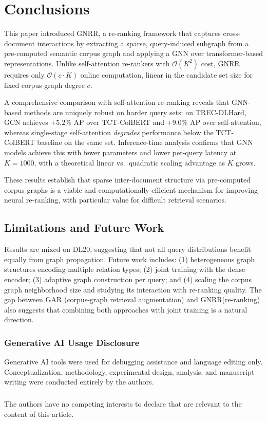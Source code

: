 \documentclass[runningheads]{llncs}
\newcommand{\ModelName}{GNRR\xspace}
\begin{document}
\section{Conclusions}
This paper introduced \ModelName, a re-ranking framework that captures cross-document interactions by extracting a sparse, query-induced subgraph from a pre-computed semantic corpus graph and applying a GNN over transformer-based representations. Unlike self-attention re-rankers with $\mathcal{O}(K^2)$ cost, \ModelName requires only $\mathcal{O}(c \cdot K)$ online computation, linear in the candidate set size for fixed corpus graph degree $c$.

A comprehensive comparison with self-attention re-ranking reveals that GNN-based methods are uniquely robust on harder query sets: on TREC-DLHard, GCN achieves $+5.2\%$ AP over TCT-ColBERT and $+9.0\%$ AP over self-attention, whereas single-stage self-attention \emph{degrades} performance below the TCT-ColBERT baseline on the same set. Inference-time analysis confirms that GNN models achieve this with fewer parameters and lower per-query latency at $K=1000$, with a theoretical linear vs.\ quadratic scaling advantage as $K$ grows.

These results establish that sparse inter-document structure via pre-computed corpus graphs is a viable and computationally efficient mechanism for improving neural re-ranking, with particular value for difficult retrieval scenarios.

\subsection*{Limitations and Future Work}
Results are mixed on DL20, suggesting that not all query distributions benefit equally from graph propagation. Future work includes: (1) heterogeneous graph structures encoding multiple relation types; (2) joint training with the dense encoder; (3) adaptive graph construction per query; and (4) scaling the corpus graph neighborhood size and studying its interaction with re-ranking quality. The gap between GAR (corpus-graph retrieval augmentation) and \ModelName (re-ranking) also suggests that combining both approaches with joint training is a natural direction.

\begin{credits}
\subsubsection{Generative AI Usage Disclosure}
Generative AI tools were used for debugging assistance and language editing only. Conceptualization, methodology, experimental design, analysis, and manuscript writing were conducted entirely by the authors.

\subsubsection{\discintname}
The authors have no competing interests to declare that are relevant to the content of this article.
\end{credits}

%
%


\end{document}
